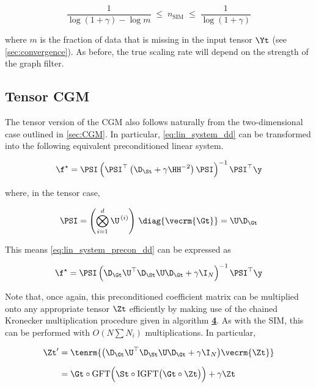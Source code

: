 $$
\frac{1}{\log(1 + \gamma) - \log m} \; \leq \; n_{\text{SIM}} \; \leq \; \frac{1}{\log(1 + \gamma)}
$$

where $m$ is the fraction of data that is missing in the input tensor $\Yt$ (see \cref{sec:convergence}). As before, the true scaling rate will depend on the strength of the graph filter. 

\subsection{Tensor CGM}

\label{sec:CGM_dd}

The tensor version of the CGM also follows naturally from the two-dimensional case outlined in \cref{sec:CGM}. In particular, \cref{eq:lin_system_dd} can be transformed into the following equivalent preconditioned linear system. 

\begin{equation}
    \label{eq:lin_system_precon_dd}
    \f^{\star} = \PSI \left( \PSI^\top \left(\D_\St + \gamma \HH^{-2}\right)\PSI \right)^{-1}\PSI^\top \y
\end{equation}

where, in the tensor case, 

\begin{equation}
    \PSI = \left( \bigotimes_{i=1}^d  \U^{\,(i)} \right) \, \diag{\vecrm{\Gt}} = \U \D_\Gt
\end{equation}

This means \cref{eq:lin_system_precon_dd} can be expressed as 

\begin{equation}
    \f^{\star} = \PSI \left( \D_\Gt \U^\top \D_\St \U \D_\Gt + \gamma \I_N \right)^{-1}\PSI^\top \y
\end{equation}

Note that, once again, this preconditioned coefficient matrix can be multiplied onto any appropriate tensor $\Zt$ efficiently by making use of the chained Kronecker multiplication procedure given in algorithm \hyperlink{KronMatMul}{\textbf{4}}. As with the SIM, this can be performed with $O(N \sum N_i)$ multiplications. In particular, 

\begin{align*}
    \Zt' &= \tenrm{\big( \D_\Gt \U^\top \D_\St \U \D_\Gt + \gamma \I_N \big) \vecrm{\Zt}} \\[0.2cm]
    &= \Gt \circ \text{GFT} \Big( \St \circ \text{IGFT} \big(\Gt \circ \Zt\big) \Big)  + \gamma \Zt
\end{align*}


